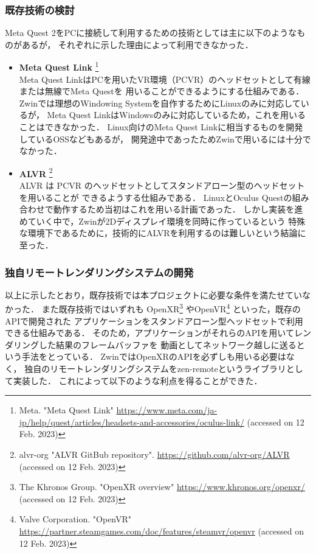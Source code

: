 \subsubsection{既存技術の検討}
\label{subsubsection:exsiting-technology}

Meta Quest 2をPCに接続して利用するための技術としては主に以下のようなものがあるが，
それぞれに示した理由によって利用できなかった．

\begin{itemize}
  \item \textbf{Meta Quest Link}
        \footnote{Meta. "Meta Quest Link"
          \url{https://www.meta.com/ja-jp/help/quest/articles/headsets-and-accessories/oculus-link/}
          (accessed on 12 Feb. 2023)} \\
        Meta Quest LinkはPCを用いたVR環境（PCVR）のヘッドセットとして有線または無線でMeta Questを
        用いることができるようにする仕組みである．
        Zwinでは理想のWindowing Systemを自作するためにLinuxのみに対応しているが，
        Meta Quest LinkはWindowsのみに対応しているため，これを用いることはできなかった．
        Linux向けのMeta Quest Linkに相当するものを開発しているOSSなどもあるが，
        開発途中であったためZwinで用いるには十分でなかった．
  \item \textbf{ALVR}
        \footnote{alvr-org "ALVR GitBub repository". \url{https://github.com/alvr-org/ALVR} (accessed on 12 Feb. 2023)} \\
        ALVR は PCVR のヘッドセットとしてスタンドアローン型のヘッドセットを用いることが
        できるようする仕組みである．
        LinuxとOculus Questの組み合わせで動作するため当初はこれを用いる計画であった．
        しかし実装を進めていく中で，Zwinが2Dディスプレイ環境を同時に作っているという
        特殊な環境下であるために，技術的にALVRを利用するのは難しいという結論に至った．
\end{itemize}

\subsubsection{独自リモートレンダリングシステムの開発}

以上に示したとおり，既存技術では本プロジェクトに必要な条件を満たせていなかった．
また既存技術ではいずれも
OpenXR\footnote{The Khronos Group. "OpenXR overview" \url{https://www.khronos.org/openxr/} (accessed on 12 Feb. 2023)}
やOpenVR\footnote{Valve Corporation. "OpenVR" \url{https://partner.steamgames.com/doc/features/steamvr/openvr} (accessed on 12 Feb. 2023)}
といった，既存のAPIで開発された
アプリケーションをスタンドアローン型ヘッドセットで利用できる仕組みである．
そのため，アプリケーションがそれらのAPIを用いてレンダリングした結果のフレームバッファを
動画としてネットワーク越しに送るという手法をとっている．
ZwinではOpenXRのAPIを必ずしも用いる必要はなく，
独自のリモートレンダリングシステムをzen-remoteというライブラリとして実装した．
これによって以下のような利点を得ることができた．

